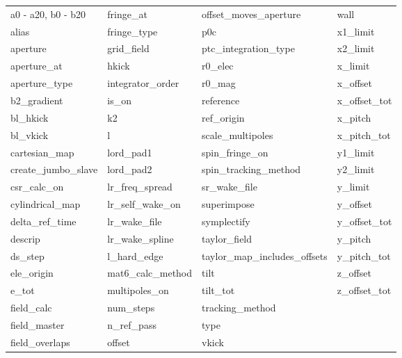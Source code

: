  \begin{tabular}{llll} \toprule
a0 - a20, b0 - b20          & fringe_at                   & offset_moves_aperture       & wall                        \\
alias                       & fringe_type                 & p0c                         & x1_limit                    \\
aperture                    & grid_field                  & ptc_integration_type        & x2_limit                    \\
aperture_at                 & hkick                       & r0_elec                     & x_limit                     \\
aperture_type               & integrator_order            & r0_mag                      & x_offset                    \\
b2_gradient                 & is_on                       & reference                   & x_offset_tot                \\
bl_hkick                    & k2                          & ref_origin                  & x_pitch                     \\
bl_vkick                    & l                           & scale_multipoles            & x_pitch_tot                 \\
cartesian_map               & lord_pad1                   & spin_fringe_on              & y1_limit                    \\
create_jumbo_slave          & lord_pad2                   & spin_tracking_method        & y2_limit                    \\
csr_calc_on                 & lr_freq_spread              & sr_wake_file                & y_limit                     \\
cylindrical_map             & lr_self_wake_on             & superimpose                 & y_offset                    \\
delta_ref_time              & lr_wake_file                & symplectify                 & y_offset_tot                \\
descrip                     & lr_wake_spline              & taylor_field                & y_pitch                     \\
ds_step                     & l_hard_edge                 & taylor_map_includes_offsets & y_pitch_tot                 \\
ele_origin                  & mat6_calc_method            & tilt                        & z_offset                    \\
e_tot                       & multipoles_on               & tilt_tot                    & z_offset_tot                \\
field_calc                  & num_steps                   & tracking_method             &                             \\
field_master                & n_ref_pass                  & type                        &                             \\
field_overlaps              & offset                      & vkick                       &                             \\
 \bottomrule
 \end{tabular}
